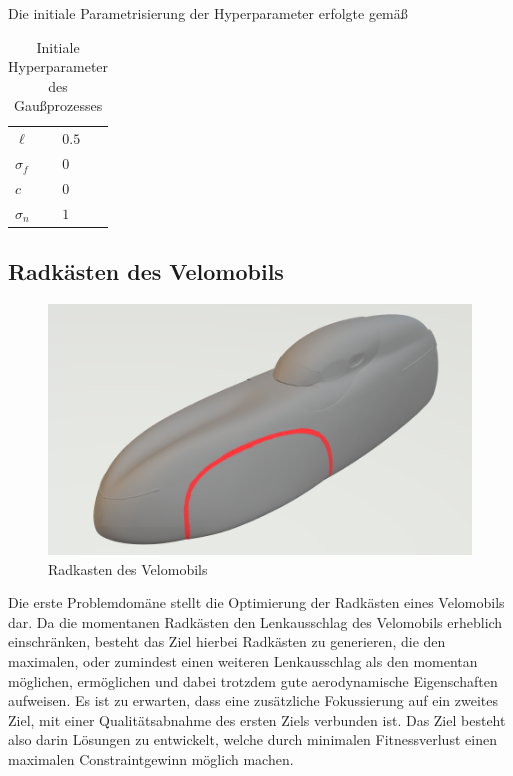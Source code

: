 Die initiale Parametrisierung der Hyperparameter erfolgte gemäß 

\begin{table}[h]
	\centering
	\begin{tabularx}{.25\textwidth}{ll}\hline
		$\ell$ & $0.5$ \\
		$\sigma_f$ & $0$ \\
		$c$ & $0$ \\
		$\sigma_n$ & $1$ \\
	\end{tabularx}
	\caption{Initiale Hyperparameter des Gaußprozesses}
	\label{tab:initialParams}
\end{table}


\subsection{Radkästen des Velomobils}
\label{sub:method_wheelcase}
\begin{figure}[h]
	\centering
	\includegraphics[width=.8\linewidth]{bilder/velo_wheelcase}
	\caption{Radkasten des Velomobils}
	\label{fig:wheelcase}
\end{figure}

Die erste Problemdomäne stellt die Optimierung der Radkästen eines Velomobils dar.
Da die momentanen Radkästen den Lenkausschlag des Velomobils erheblich einschränken, besteht das Ziel hierbei Radkästen zu generieren, die den maximalen, oder zumindest einen weiteren Lenkausschlag als den momentan möglichen, ermöglichen und dabei trotzdem gute aerodynamische Eigenschaften aufweisen.
Es ist zu erwarten, dass eine zusätzliche Fokussierung auf ein zweites Ziel, mit einer Qualitätsabnahme des ersten Ziels verbunden ist.
Das Ziel besteht also darin Lösungen zu entwickelt, welche durch minimalen Fitnessverlust einen maximalen Constraintgewinn möglich machen.

